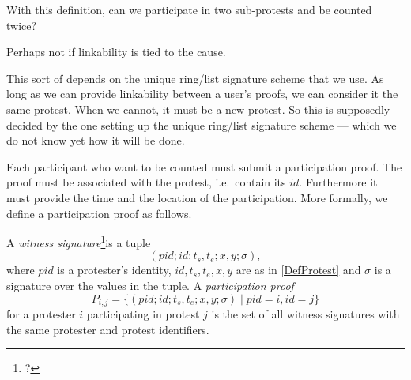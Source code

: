 \begin{frame}
\begin{question}
  With this definition, can we participate in two sub-protests and be counted 
  twice?
\end{question}
\begin{remark}
  Perhaps not if linkability is tied to the cause.
\end{remark}
\end{frame}
\begin{remark}
  This sort of depends on the unique ring/list signature scheme that we use.
  As long as we can provide linkability between a user's proofs, we can consider 
  it the same protest.
  When we cannot, it must be a new protest.
  So this is supposedly decided by the one setting up the unique ring/list 
  signature scheme --- which we do not know yet how it will be done.
\end{remark}

Each participant who want to be counted must submit a participation proof.
The proof must be associated with the protest, i.e.\ contain its \(id\).
Furthermore it must provide the time and the location of the participation.
More formally, we define a participation proof as follows.

\begin{definition}
  A \emph{witness signature}\footnote{%
    ?
  }is a tuple \[(pid; id; t_s, t_e; x, y; \sigma),\] where
  \(pid\) is a protester's identity,
  \(id, t_s, t_e, x, y\) are as in \cref{DefProtest} and
  \(\sigma\) is a signature over the values in the tuple.
  A \emph{participation proof} \[P_{i, j} = \{ (pid; id; t_s, t_e; x, y; \sigma) 
    \mid pid = i, id = j\}\] for a protester \(i\) participating in protest 
  \(j\) is the set of all witness signatures with the same protester and protest 
  identifiers.
\end{definition}


